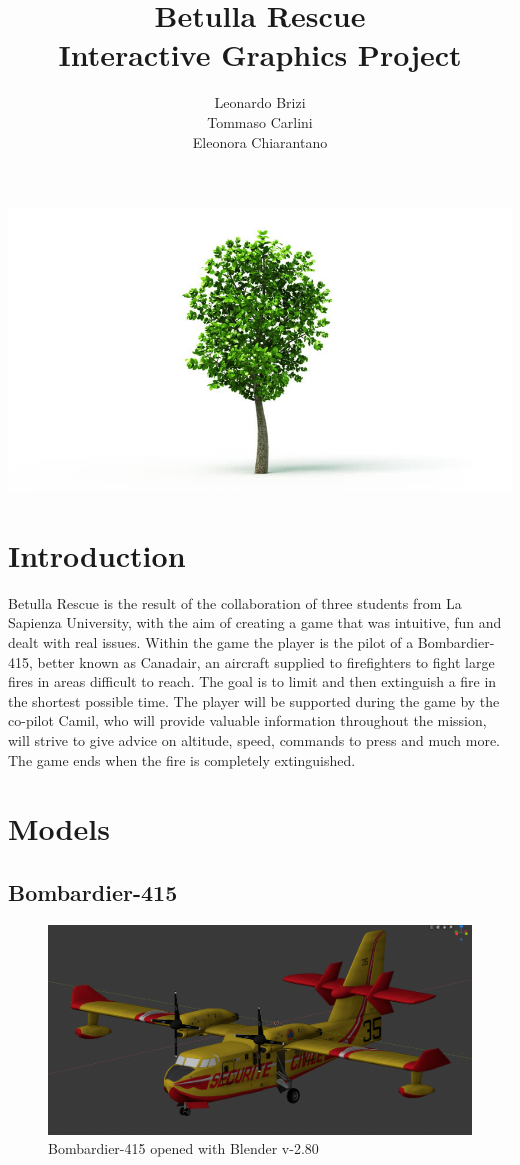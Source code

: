 \documentclass{article}
\title{Betulla Rescue \\ Interactive Graphics Project}
\author{Leonardo Brizi\\Tommaso Carlini\\Eleonora Chiarantano}
\begin{document}
\maketitle

\includegraphics[width=\linewidth]{ImmaginiReport/immag.png}

\newpage

\section*{Introduction}
Betulla Rescue is the result of the collaboration of three students from La Sapienza University, with the aim of creating a game that was intuitive, fun and dealt with real issues. Within the game the player is the pilot of a Bombardier-415, better known as Canadair, an aircraft supplied to firefighters to fight large fires in areas difficult to reach. The goal is to limit and then extinguish a fire in the shortest possible time. The player will be supported during the game by the co-pilot Camil, who will provide valuable information throughout the mission, will strive to give advice on altitude, speed, commands to press and much more. The game ends when the fire is completely extinguished.

\section*{Models}

\subsection*{Bombardier-415}

\begin{figure}[h!]
  \includegraphics[width=\linewidth]{ImmaginiReport/Canadaircomplete.png}
  \caption{Bombardier-415 opened with Blender v-2.80}
\end{figure}
 
\end{document}
